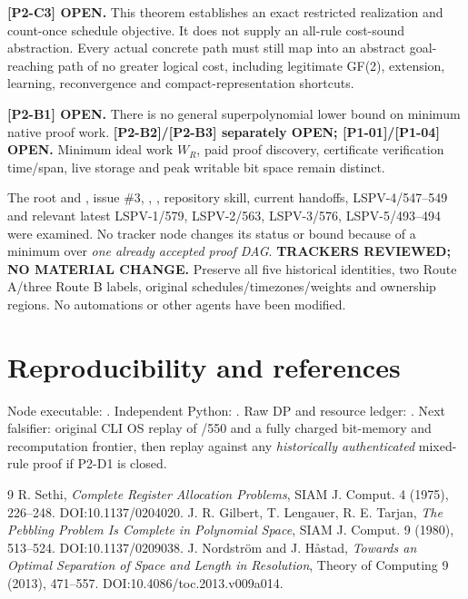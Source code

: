 \documentclass[11pt]{article}
\begin{document}
\textbf{[P2-C3] OPEN.} This theorem establishes an exact restricted realization and count-once schedule objective. It does not supply an all-rule cost-sound abstraction. Every actual concrete path must still map into an abstract goal-reaching path of no greater logical cost, including legitimate GF(2), extension, learning, reconvergence and compact-representation shortcuts.

\textbf{[P2-B1] OPEN.} There is no general superpolynomial lower bound on minimum native proof work. \textbf{[P2-B2]/[P2-B3] separately OPEN; [P1-01]/[P1-04] OPEN.} Minimum ideal work $W_R$, paid proof discovery, certificate verification time/span, live storage and peak writable bit space remain distinct.

The root  and , issue \#3, , , repository skill, current handoffs, LSPV-4/547--549 and relevant latest LSPV-1/579, LSPV-2/563, LSPV-3/576, LSPV-5/493--494 were examined. No tracker node changes its status or bound because of a minimum over \emph{one already accepted proof DAG}. \textbf{TRACKERS REVIEWED; NO MATERIAL CHANGE.} Preserve all five historical identities, two Route A/three Route B labels, original schedules/timezones/weights and  ownership regions. No automations or other agents have been modified.

\section*{Reproducibility and references}
Node executable:
.
Independent Python:
.
Raw DP and resource ledger:
.
Next falsifier: original CLI OS replay of /550 and a fully charged bit-memory and recomputation frontier, then replay against any \emph{historically authenticated} mixed-rule proof if P2-D1 is closed.

\begin{thebibliography}{9}
 R. Sethi, \emph{Complete Register Allocation Problems}, SIAM J. Comput. 4 (1975), 226--248. DOI:10.1137/0204020.
 J. R. Gilbert, T. Lengauer, R. E. Tarjan, \emph{The Pebbling Problem Is Complete in Polynomial Space}, SIAM J. Comput. 9 (1980), 513--524. DOI:10.1137/0209038.
 J. Nordstr\"om and J. H{\aa}stad, \emph{Towards an Optimal Separation of Space and Length in Resolution}, Theory of Computing 9 (2013), 471--557. DOI:10.4086/toc.2013.v009a014.
\end{thebibliography}
\end{document}
